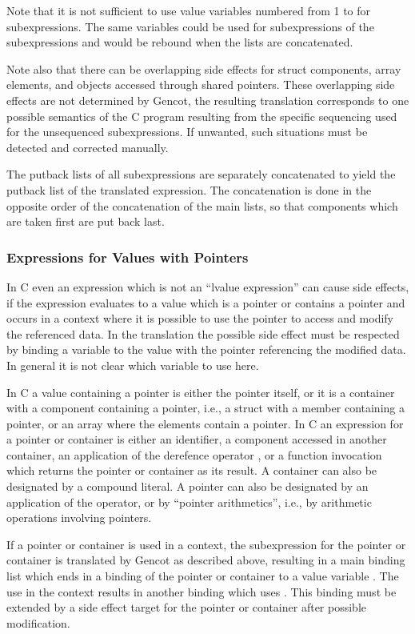Note that it is not sufficient to use value variables numbered from 1 to  for  subexpressions. The same variables
could be used for subexpressions of the subexpressions and would be rebound when the lists are concatenated.

Note also that there can be overlapping side effects for struct components, array elements, and objects accessed through
shared pointers. These overlapping side effects are not determined by Gencot, the resulting translation corresponds to
one possible semantics of the C program resulting from the specific sequencing used for the unsequenced subexpressions. 
If unwanted, such situations must be detected and corrected manually.

The putback lists of all subexpressions are separately concatenated to yield the putback list of the translated expression.
The concatenation is done in the opposite order of the concatenation of the main lists, so that components which are taken
first are put back last.

\subsubsection{Expressions for Values with Pointers}

In C even an expression which is not an ``lvalue expression'' can cause side effects, if the expression evaluates to a 
value which is a pointer or contains a pointer and occurs in a context where it is possible to use the pointer to access 
and modify the referenced data. In the translation the possible side effect must be respected by binding a variable to the 
value with the pointer referencing the modified data. In general it is not clear which variable to use here.

In C a value containing a pointer is either the pointer itself, or it is a container with a component containing a pointer,
i.e., a struct with a member containing a pointer, or an array where the elements contain a pointer. In C an expression
for a pointer or container is either an identifier, a component accessed in another container, an application of the derefence
operator \code{*}, or a function invocation which 
returns the pointer or container as its result. A container can also be designated by a compound literal. A pointer can also
be designated by an application of the \code{\&} operator, or by ``pointer arithmetics'', i.e., by arithmetic operations 
involving pointers.

If a pointer or container is used in a context, the subexpression for the pointer or container is translated by Gencot as 
described above, resulting in a main binding list which ends in a binding of the pointer or container to a value
variable . The use in the context results in another binding which uses .
This binding must be extended by a side effect target for the pointer or container after possible modification. 

